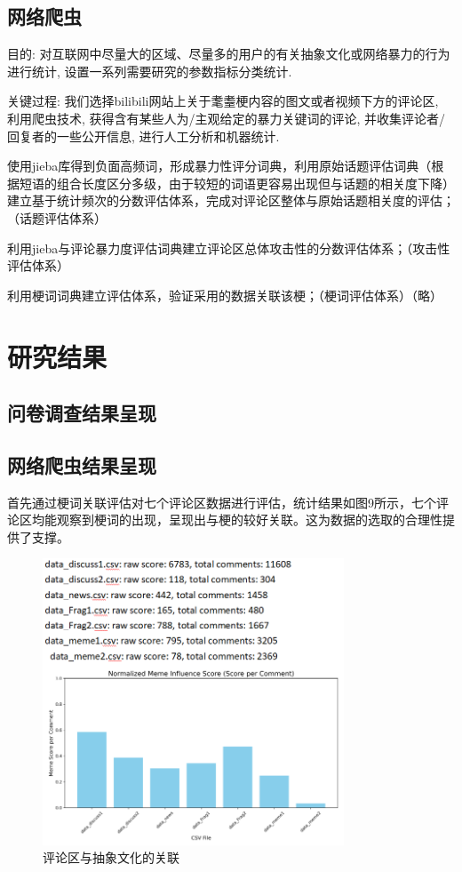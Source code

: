 \documentclass[12pt,a4paper]{ctexart}
\begin{document}
\subsection{网络爬虫}
目的: 对互联网中尽量大的区域、尽量多的用户的有关抽象文化或网络暴力的行为进行统计, 设置一系列需要研究的参数指标分类统计.

关键过程: 我们选择bilibili网站上关于耄耋梗内容的图文或者视频下方的评论区, 利用爬虫技术, 获得含有某些人为/主观给定的暴力关键词的评论, 并收集评论者/回复者的一些公开信息, 进行人工分析和机器统计.

使用jieba库得到负面高频词，形成暴力性评分词典，利用原始话题评估词典（根据短语的组合长度区分多级，由于较短的词语更容易出现但与话题的相关度下降）建立基于统计频次的分数评估体系，完成对评论区整体与原始话题相关度的评估；（话题评估体系）

利用jieba与评论暴力度评估词典建立评论区总体攻击性的分数评估体系；（攻击性评估体系）

利用梗词词典建立评估体系，验证采用的数据关联该梗；（梗词评估体系）（略）


\section{研究结果}

\subsection{问卷调查结果呈现}

\subsection{网络爬虫结果呈现}
首先通过梗词关联评估对七个评论区数据进行评估，统计结果如图9所示，七个评论区均能观察到梗词的出现，呈现出与梗的较好关联。这为数据的选取的合理性提供了支撑。

\begin{figure}[htbp]
    \centering
    \includegraphics[width=0.8\textwidth]{img/comment_area_vs_abstract.png}
    \caption{评论区与抽象文化的关联}
    \label{fig:comment_area_vs_abstract}
\end{figure}
\end{document}
